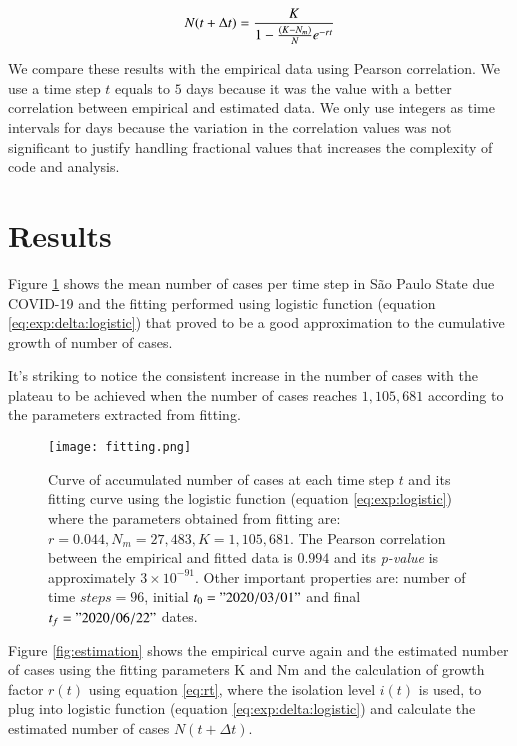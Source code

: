 \documentclass[review]{elsarticle}
\begin{document}
\begin{equation}
N(t+\Delta t) = {K \over {1- {(K-N_{m}) \over N} e^{-rt}}}
\label{eq:exp:delta:logistic}
\end{equation}

 We compare these results with the empirical data using Pearson correlation.
 We use a time step $t$ 
 equals to $5$ days because it was the value with
 a better correlation between empirical and estimated data. 
We only use integers as time intervals for days because
 the variation in the correlation values was not
 significant to justify handling fractional 
values  that increases the complexity
 of code and analysis.

\section{Results}

Figure \ref{fig:fitting} shows the mean number of cases per 
time step in São Paulo State due COVID-19 and 
the fitting performed using logistic function (equation \ref{eq:exp:delta:logistic}) 
that proved to be a good approximation to the 
cumulative growth of number of cases.

It’s striking to notice the consistent increase in the number of cases 
with the plateau to be achieved when the number of cases reaches $1,105,681$ 
according to the parameters extracted from fitting.

\begin{figure}
\texttt{[image: fitting.png]}
\caption{Curve of accumulated number of cases 
at each time step $t$ and its fitting curve 
using the logistic function (equation \ref{eq:exp:logistic}) 
where the parameters obtained from fitting are: 
$r=0.044, N_m=27,483, K=1,105,681$. 
The Pearson correlation between the empirical 
and fitted data is $0.994$ and 
its {\it p-value\/} is approximately $3\times 10^{-91}$.  
Other important properties are: 
number of time $steps=96$, 
initial $t_{0}="2020/03/01"$ 
and final $t_{f}="2020/06/22"$ 
dates.}
\label{fig:fitting}
\end{figure}

Figure \ref{fig:estimation} shows the empirical curve again 
and the estimated number of cases using 
the fitting parameters K and Nm 
and the calculation of growth factor $r(t)$ using equation \ref{eq:rt}, 
where the isolation level $i(t)$ is used, 
to plug into logistic function (equation \ref{eq:exp:delta:logistic}) 
and calculate the estimated number of cases $N(t+\Delta t)$.
\end{document}
